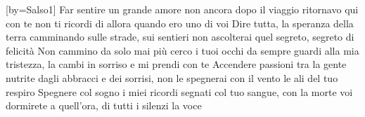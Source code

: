 [by={Salso1}]
\beginverse
Far sentire un grande amore non ancora
dopo il viaggio ritornavo qui con te
non ti ricordi di allora
quando ero uno di voi
Dire tutta, la speranza della terra
camminando sulle strade, sui sentieri
non ascolterai quel segreto,
segreto di felicità
\endverse
\beginchorus
Non cammino da solo mai più
cerco i tuoi occhi da sempre
guardi alla mia tristezza,
la cambi in sorriso e mi prendi con te
\endchorus
\beginverse
Accendere passioni tra la gente
nutrite dagli abbracci e dei sorrisi,
non le spegnerai con il vento
le ali del tuo respiro
Spegnere col sogno i miei ricordi
segnati col tuo sangue, con la morte
voi dormirete a quell'ora,
di tutti i silenzi la voce
\endverse
\endsong
